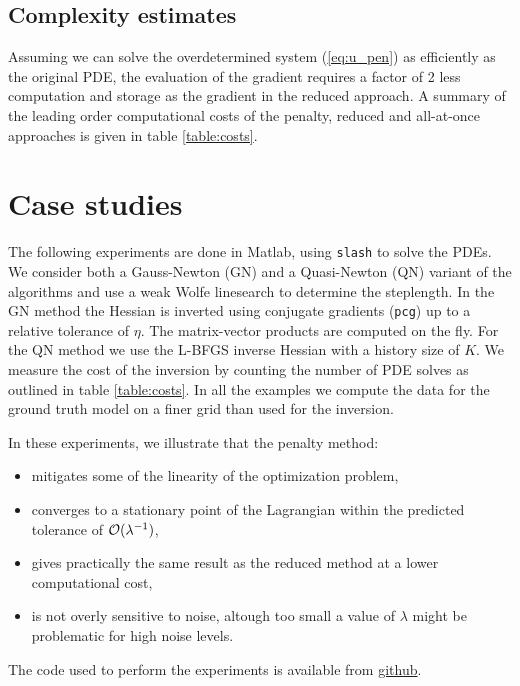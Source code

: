 \documentclass{iopart}
\begin{document}
\subsection{Complexity estimates}
Assuming we can solve the overdetermined system (\ref{eq:u_pen}) as efficiently as
the original PDE, the evaluation of the gradient requires a factor of 2 less
computation and storage as the gradient in the reduced approach. 
A summary of the leading order computational costs of the penalty, reduced and all-at-once approaches is given in table \ref{table:costs}.

\section{Case studies}
\label{examples}
The following experiments are done in Matlab, using \texttt{slash} to solve the PDEs. We consider both
a Gauss-Newton (GN) and a Quasi-Newton (QN) variant of the algorithms and use a weak Wolfe linesearch
to determine the steplength. In the GN method the Hessian is inverted using 
conjugate gradients (\texttt{pcg}) up to a relative tolerance of $\eta$. The matrix-vector products are computed on the fly.
For the QN method we use the L-BFGS inverse Hessian with a history size of $K$. 
We measure the cost of the inversion by counting the number of PDE solves as outlined in table \ref{table:costs}.
In all the examples we compute the data for the ground truth model on a finer grid than used for the inversion.

In these experiments, we illustrate that the penalty method: 
\begin{itemize}
\item mitigates some of the linearity of the optimization problem,
\item converges to a stationary point of the Lagrangian within the predicted tolerance of $\mathcal{O}(\lambda^{-1})$, 
\item gives practically the same result as the reduced method at a lower computational cost,
\item is not overly sensitive to noise, altough too small a value of $\lambda$ might be problematic for high noise levels.
\end{itemize}

The code used to perform the experiments is available from \url{github}.
\end{document}

